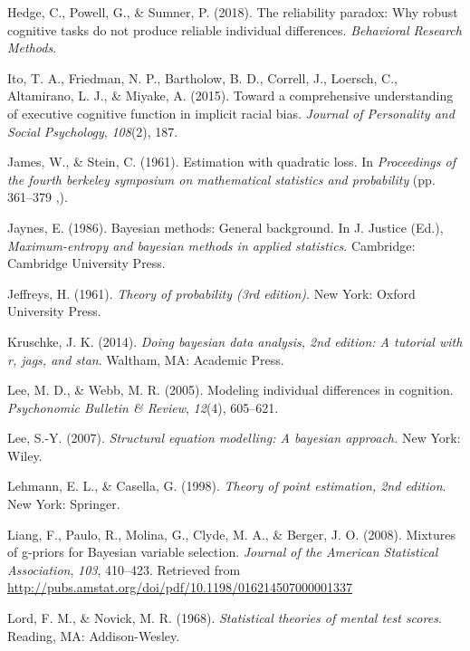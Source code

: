 \documentclass[english,man]{apa6}
\theoremstyle{definition}
\theoremstyle{definition}
\theoremstyle{definition}
\theoremstyle{remark}
\begin{document}
\hypertarget{ref-Hedge:etal:2018}{}
Hedge, C., Powell, G., \& Sumner, P. (2018). The reliability paradox:
Why robust cognitive tasks do not produce reliable individual
differences. \emph{Behavioral Research Methods}.

\hypertarget{ref-Ito:etal:2015}{}
Ito, T. A., Friedman, N. P., Bartholow, B. D., Correll, J., Loersch, C.,
Altamirano, L. J., \& Miyake, A. (2015). Toward a comprehensive
understanding of executive cognitive function in implicit racial bias.
\emph{Journal of Personality and Social Psychology}, \emph{108}(2), 187.

\hypertarget{ref-James:Stein:1961}{}
James, W., \& Stein, C. (1961). Estimation with quadratic loss. In
\emph{Proceedings of the fourth berkeley symposium on mathematical
statistics and probability} (pp. 361--379 ,).

\hypertarget{ref-Jaynes:1986}{}
Jaynes, E. (1986). Bayesian methods: General background. In J. Justice
(Ed.), \emph{Maximum-entropy and bayesian methods in applied
statistics}. Cambridge: Cambridge University Press.

\hypertarget{ref-Jeffreys:1961}{}
Jeffreys, H. (1961). \emph{Theory of probability (3rd edition)}. New
York: Oxford University Press.

\hypertarget{ref-Kruschke:2014}{}
Kruschke, J. K. (2014). \emph{Doing bayesian data analysis, 2nd edition:
A tutorial with r, jags, and stan}. Waltham, MA: Academic Press.

\hypertarget{ref-Lee:Webb:2005}{}
Lee, M. D., \& Webb, M. R. (2005). Modeling individual differences in
cognition. \emph{Psychonomic Bulletin \& Review}, \emph{12}(4),
605--621.

\hypertarget{ref-Lee:2007}{}
Lee, S.-Y. (2007). \emph{Structural equation modelling: A bayesian
approach.} New York: Wiley.

\hypertarget{ref-Lehmann:Casella:1998}{}
Lehmann, E. L., \& Casella, G. (1998). \emph{Theory of point estimation,
2nd edition}. New York: Springer.

\hypertarget{ref-Liang:etal:2008}{}
Liang, F., Paulo, R., Molina, G., Clyde, M. A., \& Berger, J. O. (2008).
Mixtures of g-priors for Bayesian variable selection. \emph{Journal of
the American Statistical Association}, \emph{103}, 410--423. Retrieved
from \url{http://pubs.amstat.org/doi/pdf/10.1198/016214507000001337}

\hypertarget{ref-Lord:Novick:1968}{}
Lord, F. M., \& Novick, M. R. (1968). \emph{Statistical theories of
mental test scores}. Reading, MA: Addison-Wesley.
\end{document}
